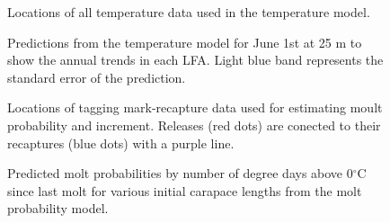 \documentclass[11pt]{article}
\newcommand{\ebh}{\string~/bio.data/bio.lobster/figures/LFA3438Framework2019/} %
\begin{document}

    \begin{figure}
    \centering
        \caption{Locations of all temperature data used in the temperature model.}

    \end{figure}

%       



    \begin{figure}
    \centering
        \caption{Predictions from the temperature model for June 1st at 25 m to show the annual trends in each LFA. Light blue band represents the standard error of the prediction.}

    \end{figure}
  
    \begin{figure}
    \centering
        \caption{Locations of tagging mark-recapture data used for estimating moult probability and increment. Releases (red dots) are conected to their recaptures (blue dots) with a purple line.}

    \end{figure}

    \begin{figure}
    \centering
        \caption{Predicted molt probabilities by number of degree days above 0$^{\circ}$C since last molt for various initial carapace lengths from the molt probability model.}

    \end{figure}
\end{document}

